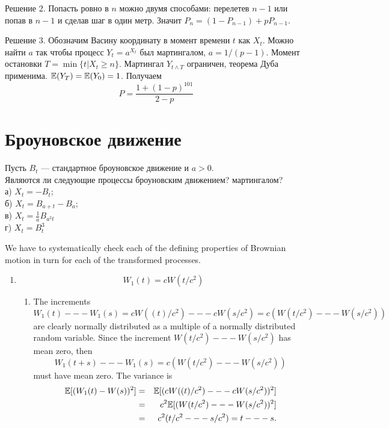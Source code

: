 \begin{solution}
\begin{solution}
\begin{solution}
\begin{solution}
\begin{solution}
\begin{solution}
\begin{solution}
\begin{solution}
\begin{solution}
{Решение 2. Попасть ровно в $n$ можно двумя способами: перелетев $n-1$ или попав в $n-1$ и сделав шаг в один метр. Значит $P_n=(1-P_{n-1})+pP_{n-1}$.

Решение 3. Обозначим Васину координату в момент времени $t$ как $X_t$. Можно найти $a$ так чтобы процесс $Y_t=a^{X_t}$ был мартингалом, $a=1/(p-1)$. Момент остановки $T=\min\{t|X_t\geq n\}$. Мартингал $Y_{t\wedge T}$ ограничен, теорема Дуба применима. $\mathbb{E}(Y_T)=\mathbb{E}(Y_0)=1$. Получаем 
\[
P=\frac{1+(1-p)^{101}}{2-p}
\]

}

\section{Броуновское движение} 

\begin{problem}
Пусть $B_{t}$ --- стандартное броуновское движение и $a>0$. \\
Являются ли следующие процессы броуновским движением? мартингалом? \\
а) $X_{t}=-B_{t}$; \\
б) $X_{t}=B_{a+t}-B_{a}$; \\
в) $X_{t}=\frac{1}{a}B_{a^{2}t}$ \\ 
г) $X_{t}=B_{t}^{3}$ 
\end{problem} 
\begin{solution} 

We have to systematically check each of the defining properties
of Brownian motion in turn for each of the transformed processes.
\begin{enumerate}
  \item
    \[
      W_1(t) = cW(t/c^2)
    \]
    \begin{enumerate}
       \item
       The increments
       \[
         W_1(t) --- W_1(s) = cW( (t)/c^2 ) --- cW(s/c^2) = c
         ( W( t/c^2  ) --- W( s/c^2 ))
       \]
       are clearly normally distributed as a multiple of a
       normally distributed random variable.  Since the
       increment $ W( t/c^2 ) --- W( s/c^2 ) $ has
       mean zero, then
       \[
         W_1(t+s) --- W_1(s) = c ( W( t/c^2 ) --- W( s/c^2
         ))
       \]
       must have mean zero.  The variance is
       \begin{eqnarray*}
         \mathbb{E}[(W_1(t)-W(s))^2] &=& \mathbb{E}[(c W((t)/c^2) --- c W(s/c^2))^2]
         \\
         &=& c^2 \mathbb{E}[ (W( t/c^2 ) --- W(s/c^2))^2] \\
         &=& c^2 (t/c^2 --- s/c^2) = t --- s.
       \end{eqnarray*}


\end{enumerate}
\end{enumerate}
\end{solution}
\end{solution}
\end{solution}
\end{solution}
\end{solution}
\end{solution}
\end{solution}
\end{solution}
\end{solution}
\end{solution}
